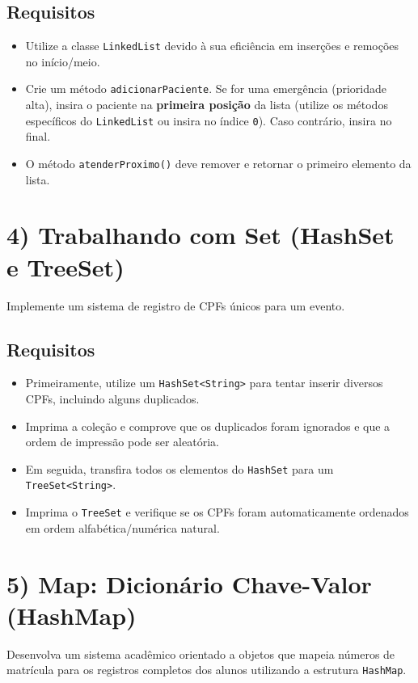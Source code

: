 \documentclass[12pt]{article}
\begin{document}
\subsection*{Requisitos}
\begin{itemize}
    \item Utilize a classe \texttt{LinkedList} devido à sua eficiência em inserções e remoções no início/meio.
    \item Crie um método \texttt{adicionarPaciente}. Se for uma emergência (prioridade alta), insira o paciente na \textbf{primeira posição} da lista (utilize os métodos específicos do \texttt{LinkedList} ou insira no índice \texttt{0}). Caso contrário, insira no final.
    \item O método \texttt{atenderProximo()} deve remover e retornar o primeiro elemento da lista.
\end{itemize}

\section*{4) Trabalhando com Set (HashSet e TreeSet)}
Implemente um sistema de registro de CPFs únicos para um evento.

\subsection*{Requisitos}
\begin{itemize}
    \item Primeiramente, utilize um \texttt{HashSet<String>} para tentar inserir diversos CPFs, incluindo alguns duplicados.
    \item Imprima a coleção e comprove que os duplicados foram ignorados e que a ordem de impressão pode ser aleatória.
    \item Em seguida, transfira todos os elementos do \texttt{HashSet} para um \texttt{TreeSet<String>}.
    \item Imprima o \texttt{TreeSet} e verifique se os CPFs foram automaticamente ordenados em ordem alfabética/numérica natural.
\end{itemize}

\section*{5) Map: Dicionário Chave-Valor (HashMap)}
Desenvolva um sistema acadêmico orientado a objetos que mapeia números de matrícula para os registros completos dos alunos utilizando a estrutura \texttt{HashMap}.
\end{document}
